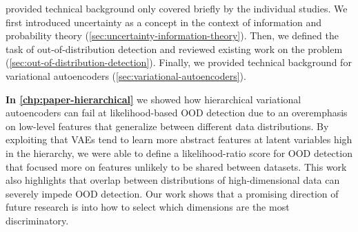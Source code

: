 \vspace{1em}
\textbf{} provided technical background only covered briefly by the individual studies. We first introduced uncertainty as a concept in the context of information and probability theory (\cref{sec:uncertainty-information-theory}). Then, we defined the task of out-of-distribution detection and reviewed existing work on the problem (\cref{sec:out-of-distribution-detection}). Finally, we provided technical background for variational autoencoders (\cref{sec:variational-autoencoders}).

\vspace{1em}
\textbf{In \cref{chp:paper-hierarchical}} we showed how hierarchical variational autoencoders can fail at likelihood-based OOD detection due to an overemphasis on low-level features that generalize between different data distributions. By exploiting that VAEs tend to learn more abstract features at latent variables high in the hierarchy, we were able to define a likelihood-ratio score for OOD detection that focused more on features unlikely to be shared between datasets. 
This work also highlights that overlap between distributions of high-dimensional data can severely impede OOD detection. Our work shows that a promising direction of future research is into how to select which dimensions are the most discriminatory.


